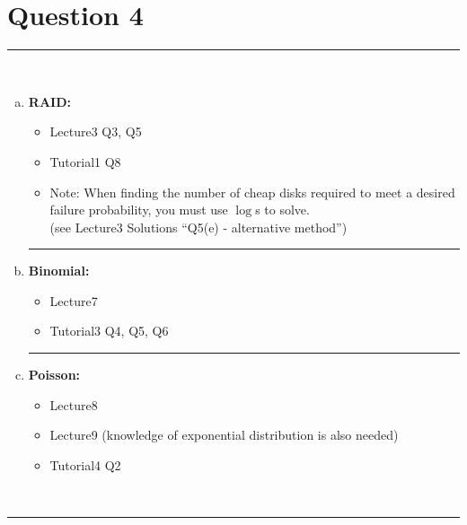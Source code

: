 \documentclass[12pt]{article}
\begin{document}
\newpage




\section*{Question 4 }
\noindent\rule{\linewidth}{1pt}
\quad\\[-0.5cm]
\begin{enumerate}[a)]
\item {\bf RAID:}
\begin{itemize}
\item Lecture3 Q3, Q5
\item Tutorial1 Q8
\item Note: When finding the number of cheap disks required to meet a desired failure probability, you must use $\log$s to solve.\\ (see Lecture3 Solutions ``Q5(e) - alternative method'')
\end{itemize}
\begin{center}\noindent\rule{0.4\linewidth}{0.5pt}\end{center}
\item {\bf Binomial:}
\begin{itemize}
\item Lecture7 %
\item Tutorial3 Q4, Q5, Q6
\end{itemize}
    \begin{center}\noindent\rule{0.4\linewidth}{0.5pt}\end{center}
\item {\bf Poisson:}
\begin{itemize}
\item Lecture8 %
\item Lecture9 (knowledge of exponential distribution is also needed)
\item Tutorial4 Q2
\end{itemize}
\end{enumerate}
\quad\\[-0.3cm]
\noindent\rule{\linewidth}{1pt}

\newpage
\end{document}
